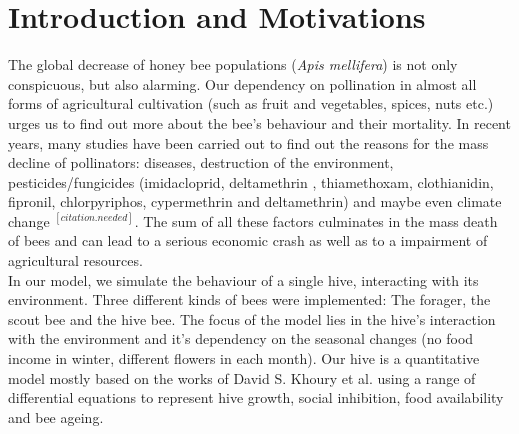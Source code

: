 \section{Introduction and Motivations}
The global decrease of honey bee populations (\textit{Apis mellifera}) is not only conspicuous, but also alarming. Our dependency on pollination in almost all forms of agricultural cultivation (such as fruit and vegetables, spices, nuts etc.) urges us to find out more about the bee's behaviour and their mortality. In recent years, many studies\cite{potts10}\cite{thomann13} have been carried out to find out the reasons for the mass decline of pollinators: diseases, destruction of the environment, pesticides/fungicides (imidacloprid, deltamethrin \cite{decourtye04}, thiamethoxam, clothianidin, fipronil, chlorpyriphos, cypermethrin and deltamethrin) and maybe even climate change $^{[citation.needed]}$. The sum of all these factors culminates in the mass death of bees and can lead to a serious economic crash as well as to a impairment of agricultural resources.\\
In our model, we simulate the behaviour of a single hive, interacting with its environment. Three different kinds of bees were implemented: The forager, the scout bee and the hive bee. The focus of the model lies in the hive's interaction with the environment and it's dependency on the seasonal changes (no food income in winter, different flowers in each month). Our hive is a quantitative model mostly based on the works of David S. Khoury et al. \cite{khoury13} using a range of differential equations to represent hive growth, social inhibition, food availability and bee ageing. 